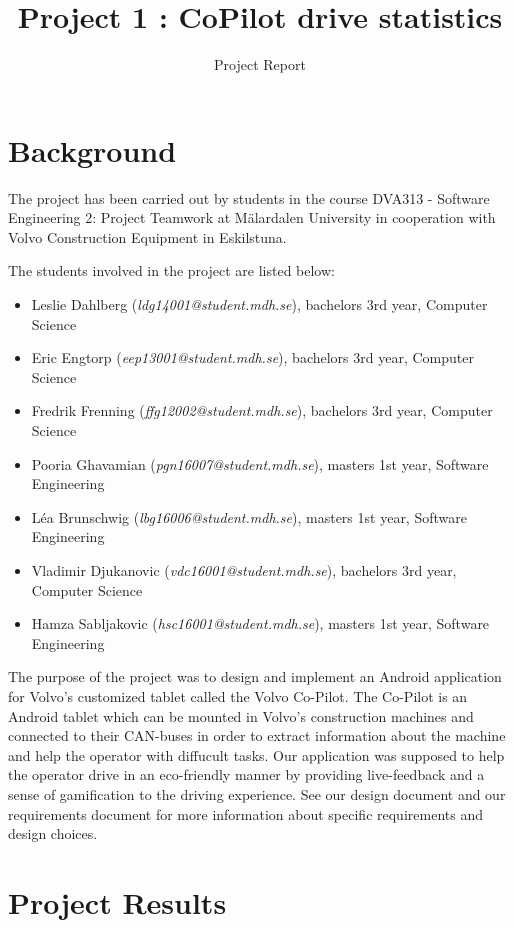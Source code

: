 \documentclass{article}
\author{Project Report}
\title{Project 1 : CoPilot drive statistics}
\begin{document}
\maketitle

\tableofcontents

\newpage

\section{Background}

The project has been carried out by students in the course DVA313 - Software Engineering 2: Project Teamwork at M\"alardalen University in cooperation with Volvo Construction Equipment in Eskilstuna.

The students involved in the project are listed below:
\begin{itemize}
\item Leslie Dahlberg (\textit{ldg14001@student.mdh.se}), bachelors 3rd year, Computer Science
\item Eric Engtorp (\textit{eep13001@student.mdh.se}), bachelors 3rd year, Computer Science
\item Fredrik Frenning (\textit{ffg12002@student.mdh.se}), bachelors 3rd year, Computer Science
\item Pooria Ghavamian (\textit{pgn16007@student.mdh.se}), masters 1st year, Software Engineering
\item L\'ea Brunschwig (\textit{lbg16006@student.mdh.se}), masters 1st year,  Software Engineering
\item Vladimir Djukanovic (\textit{vdc16001@student.mdh.se}), bachelors 3rd year, Computer Science
\item Hamza Sabljakovic (\textit{hsc16001@student.mdh.se}), masters 1st year,  Software Engineering
\end{itemize}
The purpose of the project was to design and implement an Android application for Volvo’s customized tablet called the Volvo Co-Pilot. The Co-Pilot is an Android tablet which can be mounted in Volvo’s construction machines and connected to their CAN-buses in order to extract information about the machine and help the operator with diffucult tasks. Our application was supposed to help the operator drive in an eco-friendly manner by providing live-feedback and a sense of gamification to the driving experience. See our design document and our requirements document for more information about specific requirements and design choices.

\section{Project Results}
\end{document}
